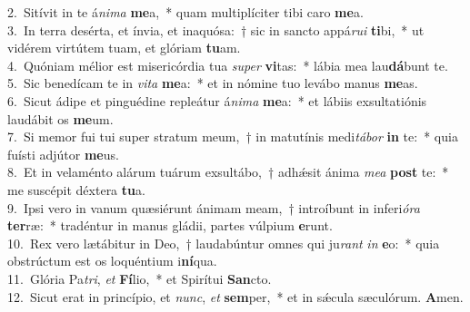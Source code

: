 {2.~}Sitívit in te á\textit{ni}\textit{ma} \textbf{me}a,~* quam multiplíciter tibi caro \textbf{me}a.\\
{3.~}In terra desérta, et ínvia, et inaquósa:~† sic in sancto appá\textit{ru}\textit{i} \textbf{ti}bi,~* ut vidérem virtútem tuam, et glóriam \textbf{tu}am.\\
{4.~}Quóniam mélior est misericórdia tua \textit{su}\textit{per} \textbf{vi}tas:~* lábia mea lau\textbf{dá}bunt te.\\
{5.~}Sic benedícam te in \textit{vi}\textit{ta} \textbf{me}a:~* et in nómine tuo levábo manus \textbf{me}as.\\
{6.~}Sicut ádipe et pinguédine repleátur á\textit{ni}\textit{ma} \textbf{me}a:~* et lábiis exsultatiónis laudábit os \textbf{me}um.\\
{7.~}Si memor fui tui super stratum meum,~† in matutínis medi\textit{tá}\textit{bor} \textbf{in} te:~* quia fuísti adjútor \textbf{me}us.\\
{8.~}Et in velaménto alárum tuárum exsultábo,~† adhǽsit ánima \textit{me}\textit{a} \textbf{post} te:~* me suscépit déxtera \textbf{tu}a.\\
{9.~}Ipsi vero in vanum quæsiérunt ánimam meam,~† introíbunt in inferi\textit{ó}\textit{ra} \textbf{ter}ræ:~* tradéntur in manus gládii, partes vúlpium \textbf{e}runt.\\
{10.~}Rex vero lætábitur in Deo,~† laudabúntur omnes qui ju\textit{rant} \textit{in} \textbf{e}o:~* quia obstrúctum est os loquéntium i\textbf{ní}qua.\\
{11.~}Glória Pa\textit{tri}, \textit{et} \textbf{Fí}lio,~* et Spirítui \textbf{San}cto.\\
{12.~}Sicut erat in princípio, et \textit{nunc}, \textit{et} \textbf{sem}per,~* et in sǽcula sæculórum. \textbf{A}men.\\
